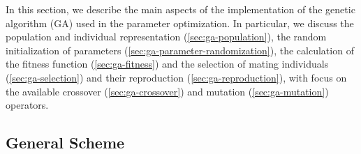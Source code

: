 \documentclass[10pt,a4paper]{report}
\numberwithin{equation}{section}
\begin{document}
In this section, we describe the main aspects of the implementation of the
genetic algorithm (GA) used in the parameter optimization.  In particular, we
discuss the population and individual representation
(\autoref{sec:ga-population}), the random initialization of parameters
(\autoref{sec:ga-parameter-randomization}), the calculation of the fitness
function (\autoref{sec:ga-fitness}) and the selection of mating individuals
(\autoref{sec:ga-selection}) and their reproduction
(\autoref{sec:ga-reproduction}), with focus on the available crossover
(\autoref{sec:ga-crossover}) and mutation (\autoref{sec:ga-mutation}) operators.

\subsection{General Scheme}
\label{sec:ga-scheme}
\end{document}
